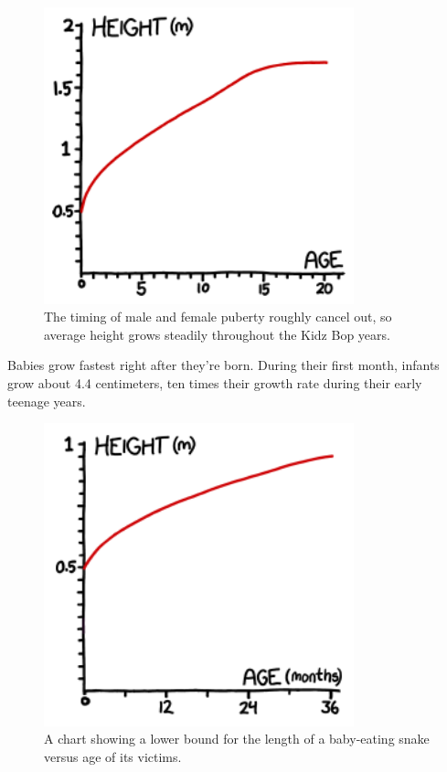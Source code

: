 {\begin{figure}[!htbp]
\centering
\includegraphics[scale=0.5, max width=0.8\textwidth]{imgs/a/77/height_chart.png}
\caption{The timing of male and female puberty roughly cancel out, so average height grows steadily throughout the Kidz Bop years.}
\end{figure}

{Babies grow fastest right after they're born. During their first month, infants grow about 4.4 centimeters, ten times their growth rate during their early teenage years.}

\begin{figure}[!htbp]
\centering
\includegraphics[scale=0.5, max width=0.8\textwidth]{imgs/a/77/height_zoom.png}
\caption{A chart showing a lower bound for the length of a baby-eating snake versus age of its victims.}
\end{figure}

}
